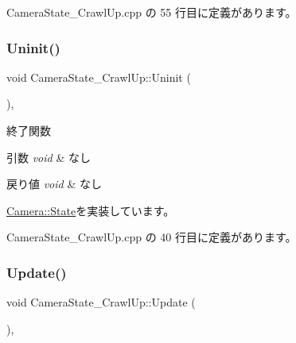  Camera\+State\+\_\+\+Crawl\+Up.\+cpp の 55 行目に定義があります。

\mbox{\label{class_camera_state___crawl_up_a046ec18a91e31b210ae000133fa6113a}} 
\subsubsection{\texorpdfstring{Uninit()}{Uninit()}}
{\footnotesize\ttfamily void Camera\+State\+\_\+\+Crawl\+Up\+::\+Uninit (\begin{DoxyParamCaption}{ }\end{DoxyParamCaption})\hspace{0.3cm}{\ttfamily [override]}, {\ttfamily [virtual]}}



終了関数 


\begin{DoxyParams}{引数}
{\em void} & なし \\
\hline
\end{DoxyParams}

\begin{DoxyRetVals}{戻り値}
{\em void} & なし \\
\hline
\end{DoxyRetVals}


\mbox{\hyperlink{class_camera_1_1_state_adb3f43b6c3f8100da7877867180e804b}{Camera\+::\+State}}を実装しています。



 Camera\+State\+\_\+\+Crawl\+Up.\+cpp の 40 行目に定義があります。

\mbox{\label{class_camera_state___crawl_up_a222f184d961d736f86dc4b2a3b227f8e}} 
\subsubsection{\texorpdfstring{Update()}{Update()}}
{\footnotesize\ttfamily void Camera\+State\+\_\+\+Crawl\+Up\+::\+Update (\begin{DoxyParamCaption}{ }\end{DoxyParamCaption})\hspace{0.3cm}{\ttfamily [override]}, {\ttfamily [virtual]}}



